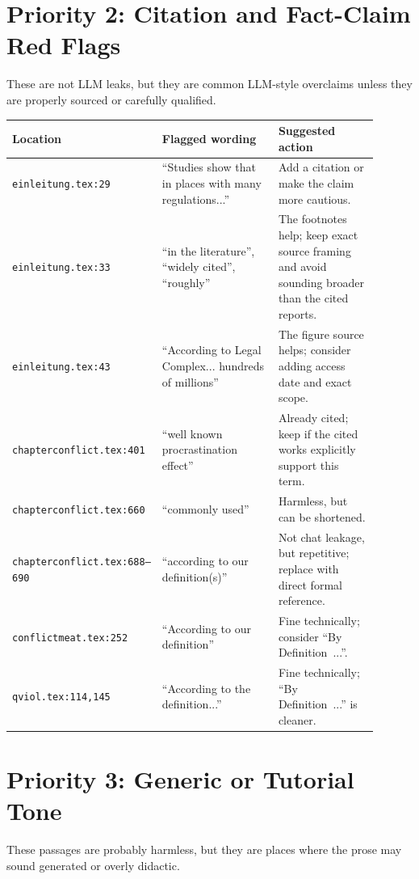 \documentclass[11pt,a4paper]{article}
\newcommand{\loc}[1]{\texttt{#1}}
\begin{document}
\section*{Priority 2: Citation and Fact-Claim Red Flags}

These are not LLM leaks, but they are common LLM-style overclaims unless they are
properly sourced or carefully qualified.

\begin{longtable}{>{\raggedright\arraybackslash}p{0.24\linewidth}
                  >{\raggedright\arraybackslash}p{0.36\linewidth}
                  >{\raggedright\arraybackslash}p{0.30\linewidth}}
\textbf{Location} & \textbf{Flagged wording} & \textbf{Suggested action} \\
\hline
\loc{einleitung.tex:29} & ``Studies show that in places with many regulations...'' & Add a citation or make the claim more cautious. \\
\loc{einleitung.tex:33} & ``in the literature'', ``widely cited'', ``roughly'' & The footnotes help; keep exact source framing and avoid sounding broader than the cited reports. \\
\loc{einleitung.tex:43} & ``According to Legal Complex... hundreds of millions'' & The figure source helps; consider adding access date and exact scope. \\
\loc{chapterconflict.tex:401} & ``well known procrastination effect'' & Already cited; keep if the cited works explicitly support this term. \\
\loc{chapterconflict.tex:660} & ``commonly used'' & Harmless, but can be shortened. \\
\loc{chapterconflict.tex:688--690} & ``according to our definition(s)'' & Not chat leakage, but repetitive; replace with direct formal reference. \\
\loc{conflictmeat.tex:252} & ``According to our definition'' & Fine technically; consider ``By Definition~...''. \\
\loc{qviol.tex:114,145} & ``According to the definition...'' & Fine technically; ``By Definition~...'' is cleaner. \\
\end{longtable}

\section*{Priority 3: Generic or Tutorial Tone}

These passages are probably harmless, but they are places where the prose may
sound generated or overly didactic.
\end{document}
